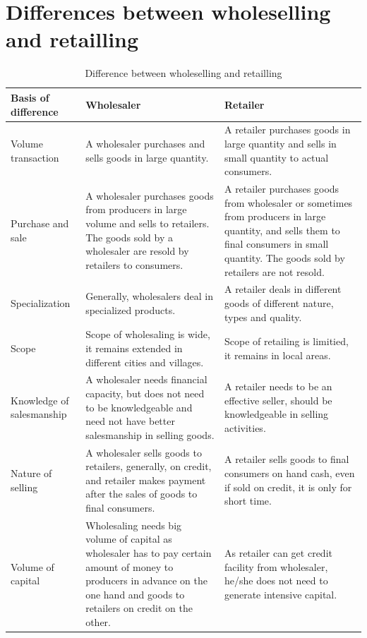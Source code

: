 \documentclass[11pt,]{book}
\theoremstyle{definition}
\theoremstyle{definition}
\theoremstyle{definition}
\theoremstyle{remark}
\begin{document}
\section{Differences between wholeselling and
retailling}\label{differences-between-wholeselling-and-retailling}

\begin{table}[H]

\caption{\label{tab:wholesale-retail}Difference between wholeselling and retailling}
\centering
\begin{tabular}[t]{>{\raggedright\arraybackslash}p{3.5cm}>{\raggedright\arraybackslash}p{5.25cm}>{\raggedright\arraybackslash}p{5.25cm}}
\toprule
\textbf{Basis of difference} & \textbf{Wholesaler} & \textbf{Retailer}\\
\midrule
Volume transaction & A wholesaler purchases and sells goods in large quantity. & A retailer purchases goods in large quantity and sells in small quantity to actual consumers.\\
Purchase and sale & A wholesaler purchases goods from producers in large volume and sells to retailers. The goods sold by a wholesaler are resold by retailers to consumers. & A retailer purchases goods from wholesaler or sometimes from producers in large quantity, and sells them to final consumers in small quantity. The goods sold by retailers are not resold.\\
Specialization & Generally, wholesalers deal in specialized products. & A retailer deals in different goods of different nature, types and quality.\\
Scope & Scope of wholesaling is wide, it remains extended in different cities and villages. & Scope of retailing is limitied, it remains in local areas.\\
Knowledge of salesmanship & A wholesaler needs financial capacity, but does not need to be knowledgeable and need not have better salesmanship in selling goods. & A retailer needs to be an effective seller, should be knowledgeable in selling activities.\\
\addlinespace
Nature of selling & A wholesaler sells goods to retailers, generally, on credit, and retailer makes payment after the sales of goods to final consumers. & A retailer sells goods to final consumers on hand cash, even if sold on credit, it is only for short time.\\
Volume of capital & Wholesaling needs big volume of capital as wholesaler has to pay certain amount of money to producers in advance on the one hand and goods to retailers on credit on the other. & As retailer can get credit facility from wholesaler, he/she does not need to generate intensive capital.\\

\end{tabular}
\end{table}
\end{document}
